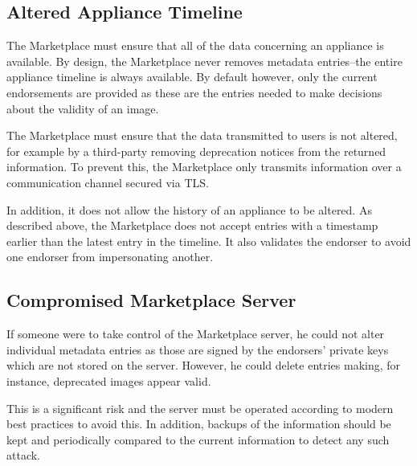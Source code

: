 \subsection{Altered Appliance Timeline}

The Marketplace must ensure that all of the data concerning an
appliance is available.  By design, the Marketplace never removes
metadata entries--the entire appliance timeline is always available.
By default however, only the current endorsements are provided as
these are the entries needed to make decisions about the validity of
an image.  

The Marketplace must ensure that the data transmitted to users is not
altered, for example by a third-party removing deprecation notices
from the returned information.  To prevent this, the Marketplace only
transmits information over a communication channel secured via TLS\@.

In addition, it does not allow the history of an appliance to be
altered.  As described above, the Marketplace does not accept entries
with a timestamp earlier than the latest entry in the timeline.  It
also validates the endorser to avoid one endorser from impersonating
another.

\subsection{Compromised Marketplace Server}

If someone were to take control of the Marketplace server, he could
not alter individual metadata entries as those are signed by the
endorsers' private keys which are not stored on the server.  However, he
could delete entries making, for instance, deprecated images appear
valid.

This is a significant risk and the server must be operated according
to modern best practices to avoid this.  In addition, backups of the
information should be kept and periodically compared to the current
information to detect any such attack.
